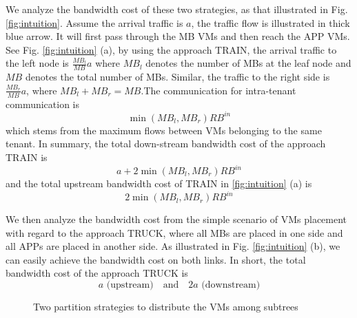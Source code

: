 \documentclass[10pt, conference, letterpaper]{IEEEtran}
\begin{document}


We analyze the bandwidth cost of these two strategies, as that illustrated in Fig. \ref{fig:intuition}. Assume the arrival traffic is $a$, the traffic flow is illustrated in thick blue arrow. It will first pass through the MB VMs and then reach the APP VMs. See Fig. \ref{fig:intuition} (a), by using the approach TRAIN, the arrival traffic to the left node is $\frac{MB_{l}}{MB} a$ where $MB_{l}$ denotes the number of MBs at the leaf node and $MB$ denotes the total number of MBs. Similar, the traffic to the right side is $\frac{MB_{r}}{MB} a$, where $MB_{l}+MB_{r}=MB$.The communication for intra-tenant communication is 
\[
	\min(MB_{l}, MB_{r})RB^{in}
\]
which stems from the maximum flows between VMs belonging to the same tenant. In summary, the total down-stream bandwidth cost of the approach TRAIN is
\[
  a+2\min(MB_l, MB_r)RB^{in} 
\]
and the total upstream bandwidth cost of TRAIN in \ref{fig:intuition} (a) is
\[
 2\min(MB_l, MB_r)RB^{in}
\]

We then analyze the bandwidth cost from the simple scenario of VMs placement with regard to the approach TRUCK, where all MBs are placed in one side and all APPs are placed in another side. As illustrated in Fig. \ref{fig:intuition} (b), we can easily achieve the bandwidth cost on both links. In short, the total bandwidth cost of the approach TRUCK is
\[
 a \text{ (upstream)} \quad \text{and}  \quad 2a \text{ (downstream)}
\]

\begin{figure}
  \centering
		\caption{Two partition strategies to distribute the VMs among subtrees}
\end{figure}
\end{document}
